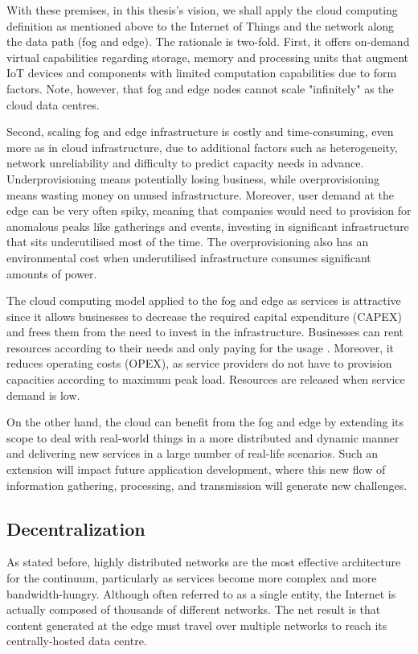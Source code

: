 \documentclass{ieeeaccess}
\begin{document}
With these premises, in this thesis's vision, we shall apply the cloud computing definition as mentioned above to the Internet of Things and the network along the data path (fog and edge). The rationale is two-fold. First, it offers on-demand virtual capabilities regarding storage, memory and processing units that augment IoT devices and components with limited computation capabilities due to form factors. Note, however, that fog and edge nodes cannot scale "infinitely" as the cloud data centres.

Second, scaling fog and edge infrastructure is costly and time-consuming, even more as in cloud infrastructure, due to additional factors such as heterogeneity, network unreliability and difficulty to predict capacity needs in advance. Underprovisioning means potentially losing business, while overprovisioning means wasting money on unused infrastructure.  Moreover, user demand at the edge can be very often spiky, meaning that companies would need to provision for anomalous peaks like gatherings and events, investing in significant infrastructure that sits underutilised most of the time. The overprovisioning also has an environmental cost when underutilised infrastructure consumes significant amounts of power.

The cloud computing model applied to the fog and edge as services is attractive since it allows businesses to decrease the required capital expenditure (CAPEX) and frees them from the need to invest in the infrastructure. Businesses can rent resources according to their needs and only paying for the usage \cite{cloud-iot}. Moreover, it reduces operating costs (OPEX), as service providers do not have to provision capacities according to maximum peak load. Resources are released when service demand is low.

On the other hand, the cloud can benefit from the fog and edge by extending its scope to deal with real-world things in a more distributed and dynamic manner and delivering new services in a large number of real-life scenarios. Such an extension will impact future application development, where this new flow of information gathering, processing, and transmission will generate new challenges.

\subsection{Decentralization}

As stated before, highly distributed networks are the most effective architecture for the continuum, particularly as services become more complex and more bandwidth-hungry. Although often referred to as a single entity, the Internet is actually composed of thousands of different networks. The net result is that content generated at the edge must travel over multiple networks to reach its centrally-hosted data centre.
\end{document}
